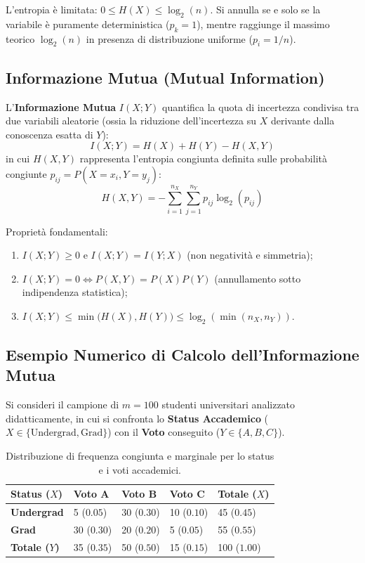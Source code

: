 L'entropia è limitata: $0 \le H(X) \le \log_2(n)$. Si annulla se e solo se la variabile è puramente deterministica ($p_k = 1$), mentre raggiunge il massimo teorico $\log_2(n)$ in presenza di distribuzione uniforme ($p_i = 1/n$).

\FloatBarrier
\subsection{Informazione Mutua (Mutual Information)}
L'\textbf{Informazione Mutua} $I(X; Y)$ quantifica la quota di incertezza condivisa tra due variabili aleatorie (ossia la riduzione dell'incertezza su $X$ derivante dalla conoscenza esatta di $Y$):
\begin{equation}
    I(X; Y) = H(X) + H(Y) - H(X, Y)
\end{equation}
in cui $H(X, Y)$ rappresenta l'entropia congiunta definita sulle probabilità congiunte $p_{ij} = P(X = x_i, Y = y_j)$:
\begin{equation}
    H(X, Y) = -\sum_{i=1}^{n_X} \sum_{j=1}^{n_Y} p_{ij} \log_2(p_{ij})
\end{equation}

Proprietà fondamentali:
\begin{enumerate}[noitemsep]
    \item $I(X; Y) \ge 0$ e $I(X; Y) = I(Y; X)$ (non negatività e simmetria);
    \item $I(X; Y) = 0 \iff P(X, Y) = P(X)P(Y)$ (annullamento sotto indipendenza statistica);
    \item $I(X; Y) \le \min\big(H(X), H(Y)\big) \le \log_2(\min(n_X, n_Y))$.
\end{enumerate}

\FloatBarrier
\subsection{Esempio Numerico di Calcolo dell'Informazione Mutua}
Si consideri il campione di $m = 100$ studenti universitari analizzato didatticamente, in cui si confronta lo \textbf{Status Accademico} ($X \in \{\text{Undergrad}, \text{Grad}\}$) con il \textbf{Voto} conseguito ($Y \in \{A, B, C\}$).

\begin{table}[H]
\centering
\small
\begin{tabularx}{\textwidth}{lYYYY}
\toprule
\textbf{Status ($X$)} & \textbf{Voto A} & \textbf{Voto B} & \textbf{Voto C} & \textbf{Totale ($X$)} \\
\midrule
\textbf{Undergrad} & 5 ($0.05$) & 30 ($0.30$) & 10 ($0.10$) & 45 ($0.45$) \\
\textbf{Grad} & 30 ($0.30$) & 20 ($0.20$) & 5 ($0.05$) & 55 ($0.55$) \\
\midrule
\textbf{Totale ($Y$)} & 35 ($0.35$) & 50 ($0.50$) & 15 ($0.15$) & 100 ($1.00$) \\
\bottomrule
\end{tabularx}
\caption{Distribuzione di frequenza congiunta e marginale per lo status e i voti accademici.}
\label{tab:dm-student-contingency}
\end{table}

